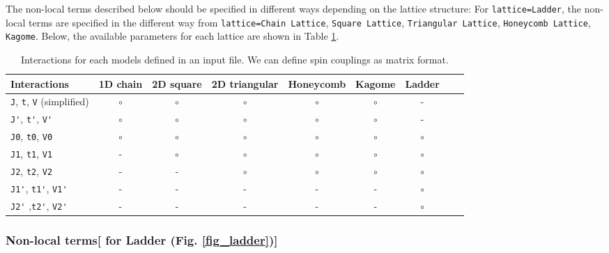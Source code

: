 The non-local terms described below should be specified
in different ways depending on the lattice structure:
For \verb|lattice=Ladder|, the non-local terms are specified in the different way
from \verb|lattice=Chain Lattice|, \verb|Square Lattice|, \verb|Triangular Lattice|, \verb|Honeycomb Lattice|, \verb|Kagome|. 
Below, the available parameters for each lattice are shown in
Table \ref{table_interactions}.

\begin{table}[tbhp]
  \begin{tabular}{|l||c|c|c|c|c|c|c|c|} \hline
    Interactions & 1D chain & 2D square & 2D triangular & Honeycomb & Kagome & Ladder\\ 
    \hline 
    \hline
     \verb|J|, \verb|t|, \verb|V| (simplified) & $\circ$	 & $\circ$ & $\circ$ & $\circ$ & $\circ$ & -\\ 
     \hline
    \verb|J'|, \verb|t'|, \verb|V'| & $\circ$	 & $\circ$	& $\circ$ 	& $\circ$ 	& $\circ$ & - \\ 
    \hline
    \verb|J0|, \verb|t0|, \verb|V0| & $\circ$  & $\circ$ 	& $\circ$ 	& $\circ$ 	& $\circ$ & $\circ$\\ 
    \hline
    \verb|J1|, \verb|t1|, \verb|V1| & -         	 & $\circ$ 	& $\circ$ 	& $\circ$ 	& $\circ$ & $\circ$\\ 
    \hline
    \verb|J2|, \verb|t2|, \verb|V2|  & -         	 & -    	& $\circ$ 	& $\circ$ 	& $\circ$ & $\circ$\\
    \hline
    \verb|J1'|, \verb|t1'|, \verb|V1'| & -		 &-	 	& -		& -		& -		& $\circ$\\
    \hline
    \verb|J2'| ,\verb|t2'|, \verb|V2'|  & -		 &-	 	& -		& -		& -		& $\circ$\\ 
    \hline
\end{tabular}
   \caption{Interactions for each models defined in an input file. We can define spin couplings as matrix format.}
    \label{table_interactions}
\end{table}

\subsubsection{Non-local terms[ for Ladder (Fig. \ref{fig_ladder})]}


